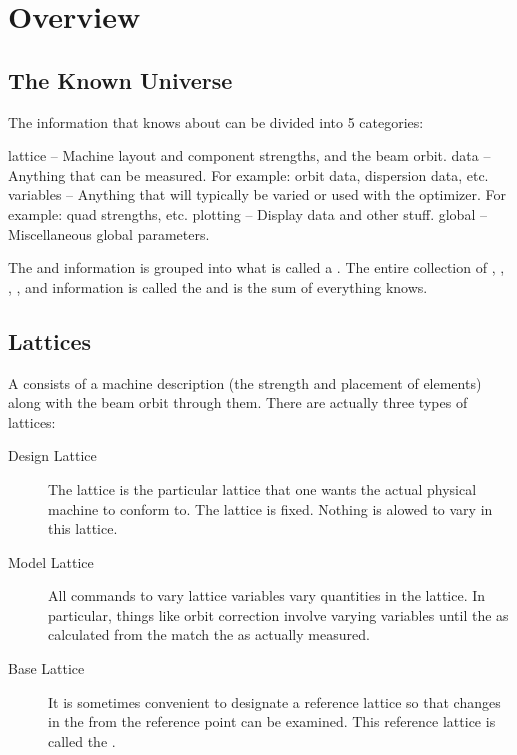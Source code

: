 \chapter{Overview}
\label{c:overview}

\section{The Known Universe}

The information that \tao knows about can be divided into 5 categories: 
\begin{example}
  lattice   -- Machine layout and component strengths, and the beam orbit.
  data      -- Anything that can be measured. 
               For example: orbit data, dispersion data, etc.
  variables -- Anything that will typically be varied or used with the optimizer. 
               For example: quad strengths, etc.
  plotting  -- Display data and other stuff.
  global    -- Miscellaneous global parameters.
\end{example}
The  and  information is grouped into what is called a
. The entire collection of , ,
, , and  information is called
the  and is the sum of everything \tao knows.

\section{Lattices}

A  consists of a machine description (the strength and placement of elements)
along with the beam orbit through them. There are actually three types of lattices:
  \vspace*{-3ex}
  \begin{description}
  \item[Design Lattice] \Newline 
The  lattice is the particular lattice that one wants the
actual physical machine to conform to. The  lattice is fixed. Nothing is
alowed to vary in this lattice.
  \item[Model Lattice] \Newline
All \tao commands to vary lattice variables vary quantities in the
 lattice. In particular, things like orbit correction
involve varying  variables until the  as calculated
from the  match the  as actually measured.
  \item[Base Lattice] \Newline
It is sometimes convenient to designate a reference lattice so that
changes in the  from the reference point can be examined.
This reference lattice is called the .
  \end{description}

